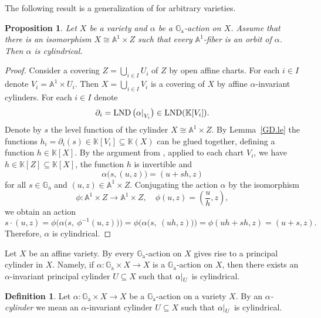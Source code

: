 \documentclass[a4paper, 12pt, reqno]{amsart}
\newcommand{\bb}{\mathbb}
\newcommand{\der}{\partial}
\newcommand{\Ga}{\bb{G}_\mathrm{a}}
\DeclareMathOperator{\LND}{LND}
\newcommand{\restrict}[2]{
    \left.
    \kern-\nulldelimiterspace{#1}
    \right|_{#2}
}
\theoremstyle{definition}
\newtheorem{defi}[counter]{Definition}
\theoremstyle{plain}
\newtheorem{prop}[counter]{Proposition}
\begin{document}
The following result is a generalization of \cite[Lemma~2.3]{ST25} for arbitrary varieties.

\begin{prop} \label{CGA.pr}
Let $X$ be a variety and $\alpha$ be a $\Ga$-action on $X$. Assume that there is an isomorphism $X \cong \bb{A}^1 \times Z$ such that every $\bb{A}^1$-fiber is an orbit of $\alpha$. Then $\alpha$ is cylindrical.
\end{prop}

\begin{proof}
Consider a covering $Z = \bigcup_{i \in I} U_i$ of $Z$ by open affine charts. For each $i \in I$ denote $V_i = \bb{A}^1 \times U_i$. Then $X = \bigcup_{i \in I} V_i$ is a covering of $X$ by affine $\alpha$-invariant cylinders. For each $i \in I$ denote
$$
\der_i =
\LND \left( \restrict{\alpha}{V_i} \right) \in
\LND(\bb{K}[V_i]).
$$
Denote by $s$ the level function of the cylinder $X \cong \bb{A}^1 \times Z$. By Lemma~\ref{GD.le} the functions $h_i = \der_i(s) \in \bb{K}[V_i] \subseteq \bb{K}(X)$ can be glued together, defining a function $h \in \bb{K}[X]$. By the argument from \cite[Lemma~2.3]{ST25}, applied to each chart $V_i$, we have $h \in \bb{K}[Z] \subseteq \bb{K}[X]$, the function $h$ is invertible and
$$
\alpha \big( s, (u, z) \big) = (u + s h, z)
$$
for all $s \in \Ga$ and $(u, z) \in \bb{A}^1 \times Z$. Conjugating the action $\alpha$ by the isomorphism
$$
\phi \colon \bb{A}^1 \times Z \to \bb{A}^1 \times Z, \quad
\phi(u, z) = \left( \frac{u}{h}, z \right),
$$
we obtain an action
$$
s \cdot (u, z) =
\phi \Big( \alpha \big( s, \ \phi^{-1}(u, z) \big) \Big) =
\phi \Big( \alpha \big( s, \ (u h, z) \big) \Big) =
\phi(u h + s h, z) = (u + s, z).
$$
Therefore, $\alpha$ is cylindrical.
\end{proof}

Let $X$ be an affine variety. By \cite[Proposition~3.1.5]{KPZ11} every $\Ga$-action on $X$ gives rise to a principal cylinder in $X$. Namely, if $\alpha \colon \Ga \times X \to X$ is a $\Ga$-action on $X$, then there exists an $\alpha$-invariant principal cylinder $U \subseteq X$ such that $\restrict{\alpha}{U}$ is cylindrical.

\begin{defi}
Let $\alpha \colon \Ga \times X \to X$ be a $\Ga$-action on a variety $X$. By an \emph{$\alpha$-cylinder} we mean an $\alpha$-invariant cylinder $U \subseteq X$ such that $\restrict{\alpha}{U}$ is cylindrical.
\end{defi}
\end{document}
